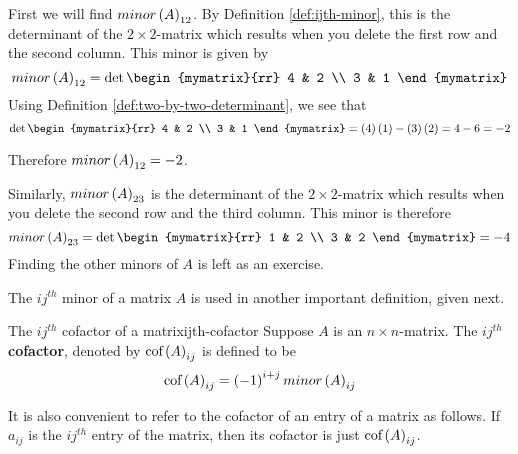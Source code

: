 \begin{solution} First we will find $minor\left(A\right) _{12}$. By Definition
\ref{def:ijth-minor}, this is the determinant of the $2\times 2$-matrix
which results when you delete the first row and the second column. This
minor is given by
\begin{equation*}
minor \tup{A}_{12}
=
\det \begin{mymatrix}{rr}
4 & 2 \\
3 & 1
\end{mymatrix}
\end{equation*}
Using Definition \ref{def:two-by-two-determinant}, we see that 
\begin{equation*}
\det \begin{mymatrix}{rr}
4 & 2 \\
3 & 1
\end{mymatrix} = \tup{4}\tup{1} - \tup{3}\tup{2} = 4 - 6 = -2
\end{equation*}

Therefore $minor \left(A\right)_{12} = -2$. 

Similarly, $minor\left(A\right)_{23}$ is the determinant of the $2\times 2$-matrix
which results when you delete the second row and the third column. This
minor is therefore
\begin{equation*}
minor \tup{A}_{23} 
=
\det \begin{mymatrix}{rr}
1 & 2 \\
3 & 2
\end{mymatrix} = -4
\end{equation*}
Finding the other minors of $A$ is left as an exercise. 
\end{solution}

The $ij^{th}$ minor of a matrix $A$ is used in another important definition, given next.

\begin{definition}{The $ij^{th}$ cofactor of a matrix}{ijth-cofactor}
Suppose $A$ is an $n\times n$-matrix. The $ij^{th}$ \textbf{cofactor}, denoted by $\mbox{\rm cof}\left(A\right) _{ij}$ is
defined to be 
\begin{equation*}
\mbox{\rm cof}\left(A\right) _{ij} = \left(-1\right) ^{i+j} minor\left(A\right)_{ij} 
\end{equation*}
\end{definition}

It is also convenient to refer to the
cofactor of an entry of a matrix as follows. If $a_{ij}$ is the $ij^{th}$ entry of the
matrix, then its cofactor is just $\mbox{\rm cof}\left(A\right) _{ij}$.

